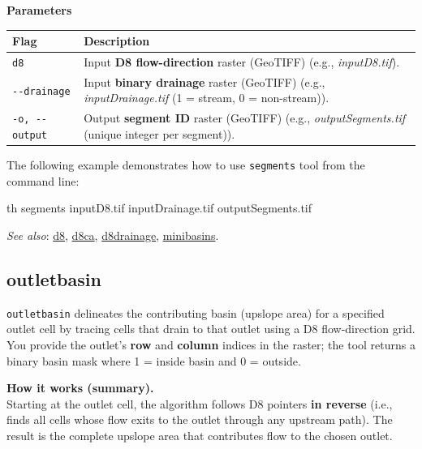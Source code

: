 \documentclass[
]{book}
\newenvironment{Shaded}{\begin{snugshade}}{\end{snugshade}}
\newcommand{\ExtensionTok}[1]{#1}
\newcommand{\NormalTok}[1]{#1}
\begin{document}
\textbf{Parameters}

\begin{longtable}[]{@{}
  >{\raggedright\arraybackslash}p{}
  >{\raggedright\arraybackslash}p{}@{}}
\toprule\noalign{}
\begin{minipage}[b]{\linewidth}\raggedright
Flag
\end{minipage} & \begin{minipage}[b]{\linewidth}\raggedright
Description
\end{minipage} \\
\midrule\noalign{}
\endhead
\bottomrule\noalign{}
\endlastfoot
\texttt{d8} & Input \textbf{D8 flow-direction} raster (GeoTIFF) (e.g., \emph{inputD8.tif}). \\
\texttt{-\/-drainage} & Input \textbf{binary drainage} raster (GeoTIFF) (e.g., \emph{inputDrainage.tif} (1 = stream, 0 = non-stream)). \\
\texttt{-o,\ -\/-output} & Output \textbf{segment ID} raster (GeoTIFF) (e.g., \emph{outputSegments.tif} (unique integer per segment)). \\
\end{longtable}

The following example demonstrates how to use \texttt{segments} tool from the command line:

\begin{Shaded}
\begin{Highlighting}[]
\ExtensionTok{th}\NormalTok{ segments inputD8.tif inputDrainage.tif outputSegments.tif}
\end{Highlighting}
\end{Shaded}

\emph{See also}: \hyperref[d8]{d8}, \hyperref[d8ca]{d8ca}, \hyperref[d8drainage]{d8drainage}, \hyperref[minibasins]{minibasins}.

\subsection{outletbasin}\label{outletbasin}

\texttt{outletbasin} delineates the contributing basin (upslope area) for a specified outlet cell by tracing cells that drain to that outlet using a D8 flow-direction grid. You provide the outlet's \textbf{row} and \textbf{column} indices in the raster; the tool returns a binary basin mask where 1 = inside basin and 0 = outside.

\textbf{How it works (summary).}\\
Starting at the outlet cell, the algorithm follows D8 pointers \textbf{in reverse} (i.e., finds all cells whose flow exits to the outlet through any upstream path). The result is the complete upslope area that contributes flow to the chosen outlet.
\end{document}
